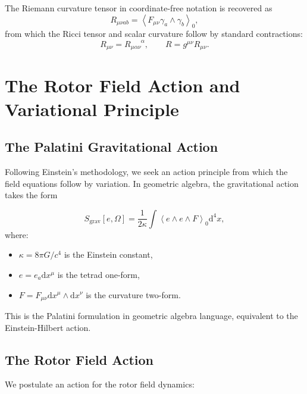 \documentclass[11pt,a4paper]{article}
\numberwithin{equation}{section}
\theoremstyle{plain}
\theoremstyle{definition}
\theoremstyle{remark}
\newcommand{\grade}[2]{\left\langle #1 \right\rangle_{#2}}
\newcommand{\scal}[1]{\grade{#1}{0}}       %
\newcommand{\dd}{\mathrm{d}}
\begin{document}
The Riemann curvature tensor in coordinate-free notation is recovered as
\begin{equation}
R_{\mu\nu ab} = \scal{F_{\mu\nu} \gamma_a \wedge \gamma_b},
\end{equation}
from which the Ricci tensor and scalar curvature follow by standard contractions:
\begin{equation}
R_{\mu\nu} = R_{\mu\alpha\nu}^{\phantom{\mu\alpha\nu}\alpha}, \qquad R = g^{\mu\nu}R_{\mu\nu}.
\end{equation}

\section{The Rotor Field Action and Variational Principle}
\label{sec:action}

\subsection{The Palatini Gravitational Action}

Following Einstein's methodology, we seek an action principle from which the field equations follow by variation. In geometric algebra, the gravitational action takes the form

\begin{equation}
S_{\mathrm{grav}}[e,\Omega] = \frac{1}{2\kappa} \int \scal{e \wedge e \wedge F} \dd^4x,
\label{eq:palatini-action}
\end{equation}
where:
\begin{itemize}
\item $\kappa = 8\pi G/c^4$ is the Einstein constant,
\item $e = e_a \dd x^\mu$ is the tetrad one-form,
\item $F = F_{\mu\nu} \dd x^\mu \wedge \dd x^\nu$ is the curvature two-form.
\end{itemize}

This is the Palatini formulation in geometric algebra language, equivalent to the Einstein-Hilbert action.

\subsection{The Rotor Field Action}

We postulate an action for the rotor field dynamics:
\end{document}
